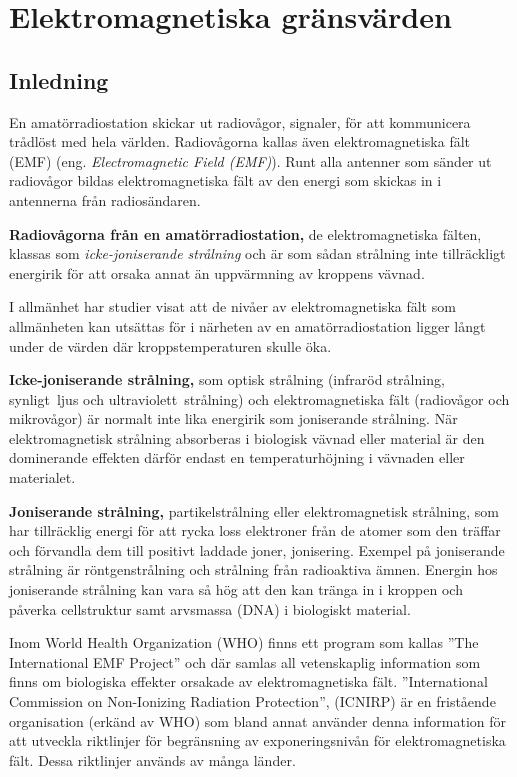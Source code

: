 \chapter[EMF gränsvärden]{Elektromagnetiska gränsvärden}
\label{EMF}

\section{Inledning}
En amatörradiostation skickar ut radiovågor, signaler, för att kommunicera
trådlöst med hela världen.
Radiovågorna kallas även elektromagnetiska fält (EMF)
(eng. \emph{Electromagnetic Field (EMF)}).
Runt alla antenner som sänder ut radiovågor bildas elektromagnetiska fält av den
energi som skickas in i antennerna från radiosändaren.

\textbf{Radiovågorna från en amatörradiostation,} de elektro\-magnetiska fälten, klassas
som \emph{icke-joniserande strålning} och är som sådan strålning inte
tillräckligt energirik för att orsaka annat än uppvärmning av kroppens vävnad.

I allmänhet har studier visat att de nivåer av elektromagnetiska fält som
allmänheten kan utsättas för i närheten av en amatörradiostation ligger långt
under de värden där kroppstemperaturen skulle öka.

\textbf{Icke-joniserande strålning,} som optisk strålning (infraröd strålning,
synligt~ljus och ultraviolett~strålning) och elektromagnetiska fält (radiovågor
och mikro\-vågor) är normalt inte lika energirik som joniserande strålning.
När elektromagnetisk strålning absorberas i biologisk vävnad eller material är
den dominerande effekten därför endast en temperaturhöjning i vävnaden eller
materialet.

\textbf{Joniserande strålning,} partikelstrålning eller elektromagnetisk strålning, som
har tillräcklig energi för att rycka loss elektroner från de atomer som den
träffar och förvandla dem till positivt laddade joner, jonisering.
Exempel på joniserande strålning är röntgenstrålning och strålning från
radioaktiva ämnen.
Energin hos joniserande strålning kan vara så hög att den kan tränga in i
kroppen och påverka cellstruktur samt arvsmassa (DNA) i biologiskt material.

Inom World Health Organization (WHO) finns ett program som kallas
''The International EMF Project'' och där samlas all vetenskaplig
information som finns om biologiska effekter orsakade av elektromagnetiska fält.
''International Commission on Non-Ionizing Radiation Protection'', (ICNIRP)
är en fristående organisation (erkänd av WHO) som bland annat använder denna
information för att utveckla riktlinjer för begränsning av exponeringsnivån för
elektromagnetiska fält.
Dessa riktlinjer används av många länder.

